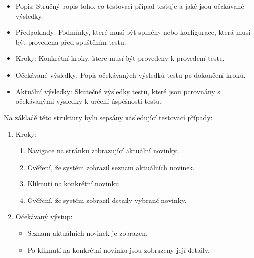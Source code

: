 \begin{itemize}
  \item Popis: Stručný popis toho, co testovací případ testuje a jaké jsou očekávané výsledky.
  \item Předpoklady: Podmínky, které musí být splněny nebo konfigurace, která musí být provedena před spuštěním testu.
  \item Kroky: Konkrétní kroky, které musí být provedeny k provedení testu.
  \item Očekávané výsledky: Popis očekávaných výsledků testu po dokončení kroků.
  \item Aktuální výsledky: Skutečné výsledky testu, které jsou porovnány s očekávanými výsledky k určení úspěšnosti testu.
\end{itemize}

Na základě této struktury bylu sepsány následující testovací případy:



\begin{enumerate}
  \item Kroky:
    \begin{enumerate}
      \item Navigace na stránku zobrazující aktuální novinky.
      \item Ověření, že systém zobrazil seznam aktuálních novinek.
      \item Kliknutí na konkrétní novinku.
      \item Ověření, že systém zobrazil detaily vybrané novinky.
    \end{enumerate}
  \item Očekávaný výstup:
    \begin{itemize}
      \item Seznam aktuálních novinek je zobrazen.
      \item Po kliknutí na konkrétní novinku jsou zobrazeny její detaily.
    \end{itemize}
\end{enumerate}


